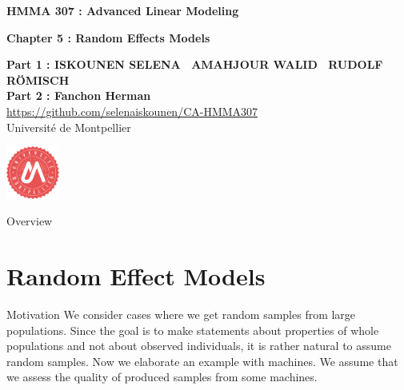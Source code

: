\documentclass[unknownkeysallowed]{beamer}
\begin{document}

\begin{frame}[noframenumbering]
\thispagestyle{empty}
\bigskip
\bigskip
\begin{center}{
\LARGE\color{marron}
\textbf{HMMA 307 : Advanced Linear Modeling}
\textbf{ }\\
\vspace{0.5cm}
}

\color{marron}
\textbf{Chapter 5 : Random Effects Models}
\end{center}

\vspace{0.5cm}

\begin{center}
\textbf{ Part 1 : ISKOUNEN SELENA \ AMAHJOUR WALID \ RUDOLF RÖMISCH } \\
\textbf{ Part 2 : Fanchon Herman}\\
\vspace{0.1cm}
\url{https://github.com/selenaiskounen/CA-HMMA307}\\
\vspace{0.5cm}
Université de Montpellier \\
\end{center}

\centering
\includegraphics[width=0.13\textwidth]{Logo.pdf}
\end{frame}

\begin{frame}{Overview} 
	\tableofcontents
\end{frame}

\section{Random Effect Models}
\begin{frame}{Motivation}
We consider cases where we get random samples from large populations. 
Since the goal is to make statements about properties of whole populations and not about observed individuals, it is rather natural to assume random samples. 
Now we elaborate an example with machines. We assume that we assess the quality of produced samples from some machines.

\end{frame}
\end{document}
